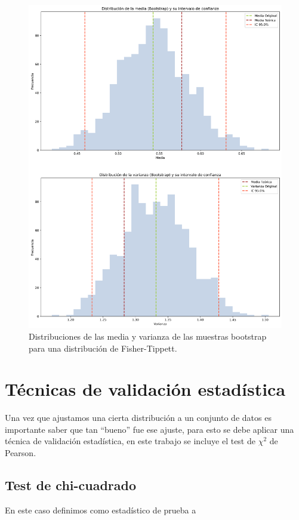 \documentclass[baaa]{baaa}
\begin{document}
\begin{figure}[h]
    \centering
    \includegraphics[width=\linewidth]{imagenes/ft_bootstrap.png}
    \caption{Distribuciones de las media y varianza de las muestras bootstrap para una distribución de Fisher-Tippett.}
    \label{fig:ft_boots}
\end{figure}


\section{Técnicas de validación estadística}
Una vez que ajustamos una cierta distribución a un conjunto de datos es importante saber que tan ``bueno'' fue ese ajuste, para esto se debe aplicar una técnica de validación estadística, en este trabajo se incluye el test de $\chi^2$ de Pearson.

\subsection{Test de chi-cuadrado}
En este caso definimos como estadístico de prueba a  
\end{document}
